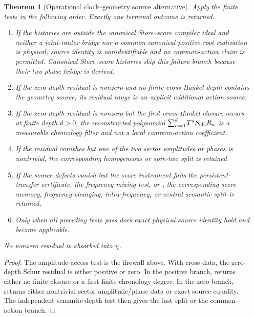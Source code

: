 \documentclass[11pt]{article}
\newtheorem{theorem}{Theorem}[section]
\theoremstyle{definition}
\theoremstyle{remark}
\begin{document}
\begin{theorem}[Operational clock--geometry source alternative]
\label{thm:clock-geometry-alternative-master}
Apply the finite tests in the following order.  Exactly one terminal outcome is
returned.
\begin{enumerate}[label=\textup{(A\arabic*)},leftmargin=3em]
\item If the histories are outside the canonical Store--score compiler ideal
      and neither a joint-router bridge nor a common canonical positive-root
      realization is physical, source identity is nonidentifiable and no
      common-action claim is permitted.  Canonical Store--score histories skip
      this failure branch because their two-phase bridge is derived.
\item If the zero-depth residual is nonzero and no finite cross-Hankel depth
      contains the geometry source, its residual range is an explicit additional
      action source.
\item If the zero-depth residual is nonzero but the first cross-Hankel closure
      occurs at finite depth $d>0$, the reconstructed polynomial
      $\sum_{n=0}^{d}T^nS_{\rm clk}R_n$ is a measurable chronology filter and not
      a local common-action coefficient.
\item If the residual vanishes but one of the two sector amplitudes or phases is
      nontrivial, the corresponding homogeneous or spin-two split is retained.
\item If the source defects vanish but the score instrument fails the
      persistent-transfer certificate, the frequency-mixing test, or
      , the corresponding score-memory,
      frequency-changing, intra-frequency, or central semantic split is retained.
\item Only when all preceding tests pass does exact physical source identity hold
      and  become applicable.
\end{enumerate}
No nonzero residual is absorbed into $\chi$.
\end{theorem}

\begin{proof}
The amplitude-access test is the firewall above.  With cross data, the
zero-depth Schur residual is either positive or zero.  In the positive branch,
 returns either no finite closure
or a first finite chronology degree.  In the zero branch,
 returns either nontrivial sector
amplitude/phase data or exact source equality.  The independent semantic-depth
test then gives the last split or the common-action branch.
\end{proof}
\end{document}
